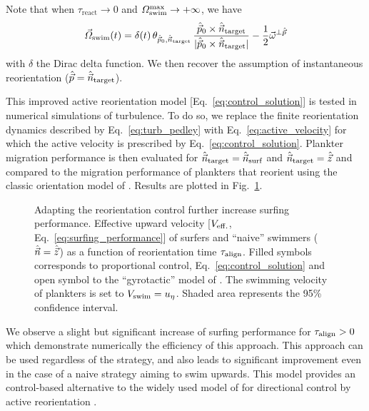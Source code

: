 Note that when $\tau_{\mathrm{react}} \to 0$ and $\varOmega_{\mathrm{swim}}^{\max} \to +\infty$, we have
\begin{equation}
		\vec{\varOmega}_{\mathrm{swim}}(t) =
			\delta(t) \, \theta_{\hat{\vec{p}}_0, \hat{\vec{n}}_{\mathrm{target}}} \, \frac{\hat{\vec{p}}_0 \times \hat{\vec{n}}_{\mathrm{target}}}{\lvert\hat{\vec{p}}_0 \times \hat{\vec{n}}_{\mathrm{target}}\rvert} - \frac{1}{2} \vec{\omega}^{\perp \hat{\vec{p}}}
\end{equation}
with $\delta$ the Dirac delta function.
We then recover the assumption of instantaneous reorientation ($\hat{\vec{p}} = \hat{\vec{n}}_{\mathrm{target}}$).

This improved active reorientation model [Eq.~\eqref{eq:control_solution}] is tested in numerical simulations of turbulence.
To do so, we replace the finite reorientation dynamics described by Eq.~\eqref{eq:turb_pedley} with Eq.~\eqref{eq:active_velocity} for which the active velocity is prescribed by Eq.~\eqref{eq:control_solution}.
Plankter migration performance is then evaluated for $\hat{\vec{n}}_{\mathrm{target}} = \hat{\vec{n}}_{\mathrm{surf}}$ and $\hat{\vec{n}}_{\mathrm{target}} = \hat{\vec{z}}$ and compared to the migration performance of plankters that reorient using the classic orientation model of \citet{Pedley1992}.
Results are plotted in Fig.~\ref{fig:surfing_reorientation_time}.
\begin{figure}%
	\centering
	
	\caption[Adapting the reorientation control further increase surfing performance.]{
		Adapting the reorientation control further increase surfing performance.
		Effective upward velocity [$V_{\mathrm{eff.}}$, Eq.~\eqref{eq:surfing_performance}] of surfers and ``naive'' swimmers ($\hat{\vec{n}} = \hat{\vec{z}}$) as a function of reorientation time $\tau_{\mathrm{align}}$.
		Filled symbols corresponds to proportional control, Eq.~\eqref{eq:control_solution} and open symbol to the ``gyrotactic'' model of \citet{Pedley1992}.
		The swimming velocity of plankters is set to $V_{\mathrm{swim}} = u_{\eta}$. 
		Shaded area represents the 95\% confidence interval.
	}
	\label{fig:surfing_reorientation_time}
\end{figure}
We observe a slight but significant increase of surfing performance for $\tau_{\mathrm{align}} > 0$ which demonstrate numerically the efficiency of this approach.
This approach can be used regardless of the strategy, and also leads to significant improvement even in the case of a naive strategy aiming to swim upwards.
This model provides an control-based alternative to the widely used model of \citet{Pedley1992} for directional control by active reorientation \citep{colabrese2017flow, gustavsson2017finding, lange2021sperm}.

